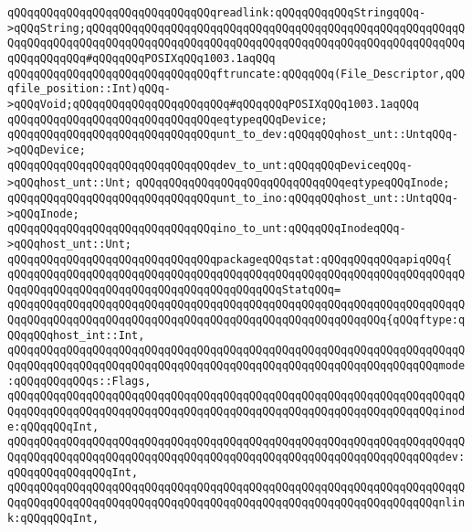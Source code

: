 \verb|qQQqqQQqqQQqqQQqqQQqqQQqqQQqqQQqreadlink:qQQqqQQqqQQqStringqQQq->qQQqString;qQQqqQQqqQQqqQQqqQQqqQQqqQQqqQQqqQQqqQQqqQQqqQQqqQQqqQQqqQQqqQQqqQQqqQQqqQQqqQQqqQQqqQQqqQQqqQQqqQQqqQQqqQQqqQQqqQQqqQQqqQQqqQQqqQQqqQQqqQQq#qQQqqQQqPOSIXqQQq1003.1aqQQq|\newline
\verb|qQQqqQQqqQQqqQQqqQQqqQQqqQQqqQQqftruncate:qQQqqQQq(File_Descriptor,qQQqfile_position::Int)qQQq->qQQqVoid;qQQqqQQqqQQqqQQqqQQqqQQq#qQQqqQQqPOSIXqQQq1003.1aqQQq|\newline
\newline
\verb|qQQqqQQqqQQqqQQqqQQqqQQqqQQqqQQqeqtypeqQQqDevice;|\newline
\verb|qQQqqQQqqQQqqQQqqQQqqQQqqQQqqQQqunt_to_dev:qQQqqQQqhost_unt::UntqQQq->qQQqDevice;|\newline
\verb|qQQqqQQqqQQqqQQqqQQqqQQqqQQqqQQqdev_to_unt:qQQqqQQqDeviceqQQq->qQQqhost_unt::Unt;|\newline
\newline
\verb|qQQqqQQqqQQqqQQqqQQqqQQqqQQqqQQqeqtypeqQQqInode;|\newline
\verb|qQQqqQQqqQQqqQQqqQQqqQQqqQQqqQQqunt_to_ino:qQQqqQQqhost_unt::UntqQQq->qQQqInode;|\newline
\verb|qQQqqQQqqQQqqQQqqQQqqQQqqQQqqQQqino_to_unt:qQQqqQQqInodeqQQq->qQQqhost_unt::Unt;|\newline
\newline
\verb|qQQqqQQqqQQqqQQqqQQqqQQqqQQqqQQqpackageqQQqstat:qQQqqQQqqQQqapiqQQq{|\newline
\verb|qQQqqQQqqQQqqQQqqQQqqQQqqQQqqQQqqQQqqQQqqQQqqQQqqQQqqQQqqQQqqQQqqQQqqQQqqQQqqQQqqQQqqQQqqQQqqQQqqQQqqQQqqQQqqQQqStatqQQq=|\newline
\verb|qQQqqQQqqQQqqQQqqQQqqQQqqQQqqQQqqQQqqQQqqQQqqQQqqQQqqQQqqQQqqQQqqQQqqQQqqQQqqQQqqQQqqQQqqQQqqQQqqQQqqQQqqQQqqQQqqQQqqQQqqQQqqQQq{qQQqftype:qQQqqQQqhost_int::Int,|\newline
\verb|qQQqqQQqqQQqqQQqqQQqqQQqqQQqqQQqqQQqqQQqqQQqqQQqqQQqqQQqqQQqqQQqqQQqqQQqqQQqqQQqqQQqqQQqqQQqqQQqqQQqqQQqqQQqqQQqqQQqqQQqqQQqqQQqqQQqqQQqmode:qQQqqQQqqQQqs::Flags,|\newline
\verb|qQQqqQQqqQQqqQQqqQQqqQQqqQQqqQQqqQQqqQQqqQQqqQQqqQQqqQQqqQQqqQQqqQQqqQQqqQQqqQQqqQQqqQQqqQQqqQQqqQQqqQQqqQQqqQQqqQQqqQQqqQQqqQQqqQQqqQQqinode:qQQqqQQqInt,|\newline
\verb|qQQqqQQqqQQqqQQqqQQqqQQqqQQqqQQqqQQqqQQqqQQqqQQqqQQqqQQqqQQqqQQqqQQqqQQqqQQqqQQqqQQqqQQqqQQqqQQqqQQqqQQqqQQqqQQqqQQqqQQqqQQqqQQqqQQqqQQqdev:qQQqqQQqqQQqqQQqInt,|\newline
\verb|qQQqqQQqqQQqqQQqqQQqqQQqqQQqqQQqqQQqqQQqqQQqqQQqqQQqqQQqqQQqqQQqqQQqqQQqqQQqqQQqqQQqqQQqqQQqqQQqqQQqqQQqqQQqqQQqqQQqqQQqqQQqqQQqqQQqqQQqnlink:qQQqqQQqInt,|\newline
